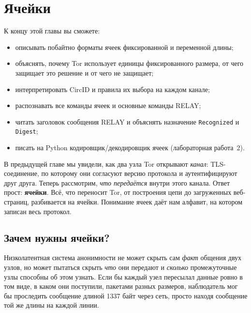 \chapter{Ячейки}\label{cap:08-celle}

\begin{obiettivi}
К концу этой главы вы сможете:
\begin{itemize}[nosep]
  \item описывать побайтно форматы ячеек фиксированной и переменной длины;
  \item объяснять, почему Tor использует единицы фиксированного размера, от чего защищает это решение и от чего не защищает;
  \item интерпретировать CircID и правила их выбора на каждом канале;
  \item распознавать все команды ячеек и основные команды RELAY;
  \item читать заголовок сообщения RELAY и объяснять назначение \texttt{Recognized} и \texttt{Digest};
  \item писать на Python кодировщик/декодировщик ячеек (лабораторная работа~2).
\end{itemize}
\end{obiettivi}

В предыдущей главе мы увидели, как два узла Tor открывают \emph{канал}: TLS-соединение, по которому они согласуют версию протокола и аутентифицируют друг друга. Теперь рассмотрим, \emph{что передаётся} внутри этого канала. Ответ прост: \textbf{ячейки}. Всё, что переносит Tor, от построения цепи до загруженных веб-страниц, разбивается на ячейки. Понимание ячеек даёт нам алфавит, на котором записан весь протокол.

\section{Зачем нужны ячейки?}\label{sec:celle-perche}

Низколатентная система анонимности не может скрыть сам \emph{факт} общения двух узлов, но может пытаться скрыть \emph{что} они передают и \emph{сколько} промежуточные узлы способны об этом узнать. Если бы каждый узел пересылал данные ровно в том виде, в каком они поступили, пакетами разных размеров, наблюдатель мог бы проследить сообщение длиной 1337 байт через сеть, просто находя сообщение той же длины на каждой линии.


